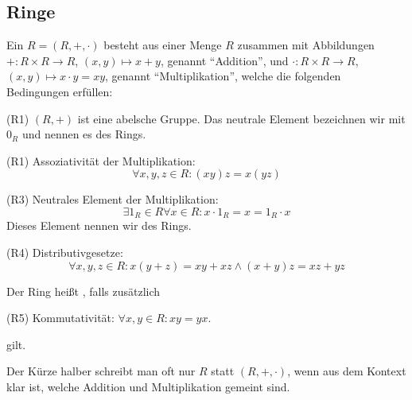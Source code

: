 
\subsection{Ringe}\label{ringe}
\begin{definition}
    Ein  $R=(R,+,\cdot)$ besteht aus einer Menge $R$ zusammen mit Abbildungen ${+} : R \times R \to R$, $(x,y) \mapsto x+y$, genannt \enquote{Addition}, und $\cdot : R\times R \to R$, $(x,y) \mapsto x\cdot y = xy$, genannt \enquote{Multiplikation}, welche die folgenden Bedingungen erfüllen:
    \begin{description}
        \item{(R1)} $(R,+)$ ist eine abelsche Gruppe. Das neutrale Element bezeichnen wir mit $0_R$ und nennen es  des Rings.
        \item{(R1)} Assoziativität der Multiplikation:
        \[\forall x,y,z\in R: (xy)z = x(yz)\]
        \item{(R3)} Neutrales Element der Multiplikation:
        \[\exists 1_R\in R \forall x\in R: x\cdot 1_R=x=1_R\cdot x\]
        Dieses Element nennen wir  des Rings.
        \item{(R4)} Distributivgesetze:
        \[\forall x,y,z\in R: x(y+z)=xy+xz \wedge (x+y)z=xz+yz\]
    \end{description}
    Der Ring heißt , falls zusätzlich
    \begin{description}
        \item{(R5)} Kommutativität: $\forall x,y\in R: xy=yx$.
    \end{description}
    gilt.

    Der Kürze halber schreibt man oft nur $R$ statt $(R,+,\cdot)$, wenn aus dem Kontext klar ist, welche Addition und Multiplikation gemeint sind.
\end{definition}

